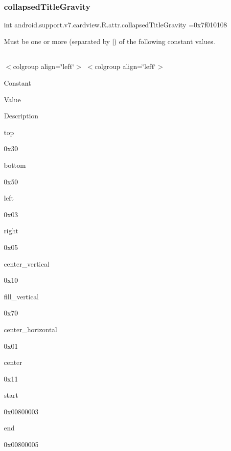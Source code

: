 \subsubsection{\texorpdfstring{collapsed\+Title\+Gravity}{collapsedTitleGravity}}
{\footnotesize\ttfamily int android.\+support.\+v7.\+cardview.\+R.\+attr.\+collapsed\+Title\+Gravity =0x7f010108\hspace{0.3cm}{\ttfamily [static]}}

Must be one or more (separated by \textquotesingle{}$\vert$\textquotesingle{}) of the following constant values.

\tabulinesep=1mm
\begin{longtabu} spread 0pt [c]{*{0}{|X[-1]}|}
\hline
\end{longtabu}
$<$colgroup align=\char`\"{}left\char`\"{}$>$ $<$colgroup align=\char`\"{}left\char`\"{}$>$ 

Constant

Value

Description 

{\ttfamily top}

0x30

{\ttfamily bottom}

0x50

{\ttfamily left}

0x03

{\ttfamily right}

0x05

{\ttfamily center\+\_\+vertical}

0x10

{\ttfamily fill\+\_\+vertical}

0x70

{\ttfamily center\+\_\+horizontal}

0x01

{\ttfamily center}

0x11

{\ttfamily start}

0x00800003

{\ttfamily end}

0x00800005\mbox{\label{classandroid_1_1support_1_1v7_1_1cardview_1_1R_1_1attr_a6badac0213756c6bf93f7cef451007a2}} 

